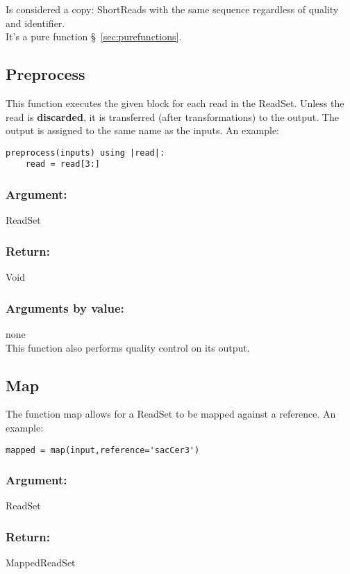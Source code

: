 \documentclass{article}
\begin{document}
\noindent
Is considered a copy: ShortReads with the same sequence regardless of quality and identifier.\\

\noindent
It's a pure function §~\ref{sec:purefunctions}.
\subsection{Preprocess}

This function executes the given block for each read in the ReadSet. Unless the read is \textbf{discarded}, it is transferred (after transformations) to the output. The output is assigned to the same name as the inputs. An example:


\begin{verbatim}
preprocess(inputs) using |read|:
    read = read[3:]
\end{verbatim}

\subsubsection*{Argument:}
ReadSet

\subsubsection*{Return:}
Void

\subsubsection*{Arguments by value:}
none\\

\noindent
This function also performs quality control on its output.


\subsection{Map}

The function map allows for a ReadSet to be mapped against a reference. An example:

\begin{verbatim}
mapped = map(input,reference='sacCer3')
\end{verbatim}

\subsubsection*{Argument:}
ReadSet

\subsubsection*{Return:}
MappedReadSet
\end{document}
